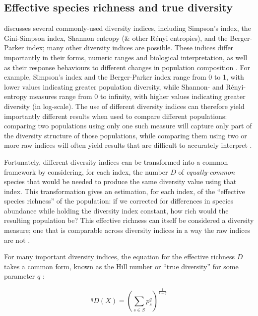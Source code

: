 \subsection{Effective species richness and true diversity}
\label{app:diversity-unitary-hill}

 discusses several commonly-used diversity indices, including Simpson's index, the Gini-Simpson index, Shannon entropy (\& other R\'{e}nyi entropies), and the Berger-Parker index; many other diversity indices are possible. These indices differ importantly in their forms, numeric ranges and biological interpretation, as well as their response behaviours to different changes in population composition \citep{peet1974diversity, jost2006entropy}. For example, Simpson's index and the Berger-Parker index range from 0 to 1, with lower values indicating greater population diversity, while Shannon- and R\'{e}nyi-entropy measures range from 0 to infinity, with higher values indicating greater diversity (in log-scale). The use of different diversity indices can therefore yield importantly different results when used to compare different populations: comparing two populations using only one such measure will capture only part of the diversity structure of those populations, while comparing them using two or more raw indices will often yield results that are difficult to accurately interpret \citep{peet1974diversity, jost2006entropy}.

Fortunately, different diversity indices can be transformed into a common framework by considering, for each index, the number $D$ of \textit{equally-common} species that would be needed to produce the same diversity value using that index. This transformation gives an estimation, for each index, of the ``effective species richness'' of the population: if we corrected for differences in species abundance while holding the diversity index constant, how rich would the resulting population be? This effective richness can itself be considered a diversity measure; one that is comparable across diversity indices in a way the raw indices are not \citep{jost2006entropy}.

For many important diversity indices, the equation for the effective richness $D$ takes a common form, known as the Hill number or ``true diversity'' for some parameter $q$ \citep{hill1973diversity, jost2006entropy}:

\begin{equation}
^qD(X) = \left(\sum_{s \in S} p_s^q \right)^{\frac{1}{1-q}}
\label{eq:hill_index}
\end{equation}

